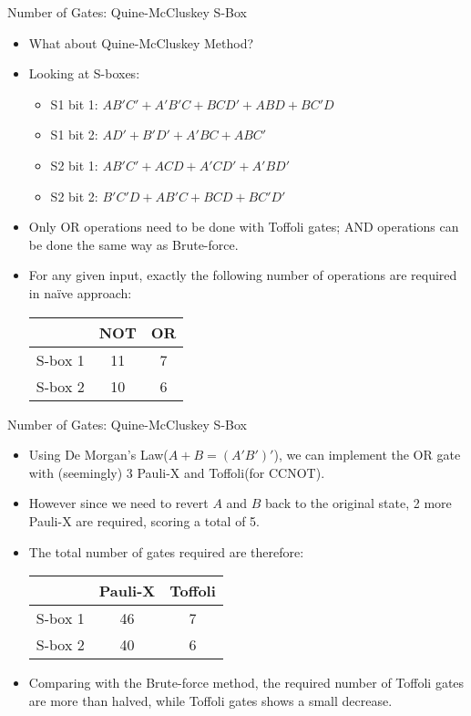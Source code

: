 \documentclass{beamer}
\begin{document}
	\begin{frame}{Number of Gates: Quine-McCluskey S-Box}
		\begin{itemize}
			\item What about Quine-McCluskey Method?
			\item Looking at S-boxes:
			\begin{itemize}
				\item S1 bit 1: $AB'C'+A'B'C+BCD'+ABD+BC'D$
				\item S1 bit 2: $AD'+B'D'+A'BC+ABC'$
				\item S2 bit 1: $AB'C'+ACD+A'CD'+A'BD'$
				\item S2 bit 2: $B'C'D+AB'C+BCD+BC'D'$
			\end{itemize}
			\item Only OR operations need to be done with Toffoli gates; AND operations can be done the same way as Brute-force.
			\item For any given input, exactly the following number of operations are required in naïve approach:
			\begin{center}
				\begin{tabular}{c|c|c}
					& NOT & OR \\\hline
					S-box 1 & 11      & 7      \\\hline
					S-box 2 & 10      & 6
				\end{tabular}
			\end{center}
		\end{itemize}
	\end{frame}
	
	\begin{frame}{Number of Gates: Quine-McCluskey S-Box}
		\begin{itemize}
			\item Using De Morgan's Law($A+B=(A'B')'$), we can implement the OR gate with (seemingly) 3 Pauli-X and Toffoli(for CCNOT).
			\item However since we need to revert $A$ and $B$ back to the original state, 2 more Pauli-X are required, scoring a total of 5.
			\item The total number of gates required are therefore:
			\begin{center}
				\begin{tabular}{c|c|c}
					& Pauli-X & Toffoli \\\hline
					S-box 1 & 46      & 7      \\\hline
					S-box 2 & 40      & 6
				\end{tabular}
			\end{center}
			\item Comparing with the Brute-force method, the required number of Toffoli gates are more than halved, while Toffoli gates shows a small decrease.
		\end{itemize}
	\end{frame}
	
\end{document}

